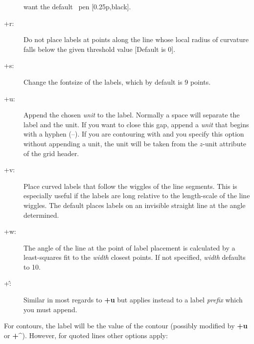 \begin{description}
want the default \GMT\ pen [0.25p,black].
\item [+r:] Do not place labels at points along the line whose local radius of curvature falls below
the given threshold value [Default is 0].
\item [+s:] Change the fontsize of the labels, which by default is 9 points.
\item [+u:] Append the chosen {\it unit} to the label.  Normally a space will separate the label
and the unit.  If you want to close this gap, append a {\it unit} that begins with a hyphen (--).
If you are contouring with  and you specify this option without appending a unit, the unit will be taken from the
$z$-unit attribute of the grid header.
\item [+v:]  Place curved labels that follow the wiggles of the line segments.  This is especially
useful if the labels are long relative to the length-scale of the line wiggles.  The default places labels
on an invisible straight line at the angle determined.
\item [+w:] The angle of the line at the point of label placement is calculated by a least-squares
fit to the {\it width} closest points.  If not specified, {\it width} defaults to 10.
\item [+\^:]  Similar in most regards to {\bf +u} but applies instead to a label \emph{prefix} which
you must append.
\end{description}
For contours, the label will be the value of the contour (possibly modified by {\bf +u} or {\bf +\^}).
However, for quoted lines other options apply:
